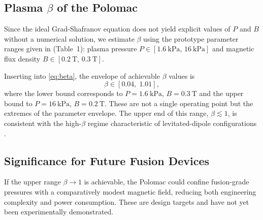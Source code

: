 \subsection{Plasma \texorpdfstring{$\beta$}{Beta} of the Polomac}

Since the ideal Grad-Shafranov equation does not yield explicit values of $P$
and $B$ without a numerical solution, we estimate $\beta$ using the prototype
parameter ranges given in \cite{Elio2024} (Table~1): plasma pressure
$P \in [\SI{1.6}{\kilo\pascal},\, \SI{16}{\kilo\pascal}]$ and magnetic flux
density $B \in [\SI{0.2}{\tesla},\, \SI{0.3}{\tesla}]$.

Inserting into \eqref{eq:beta}, the envelope of achievable $\beta$ values is
\begin{equation*}
    \beta \in [0.04,\; 1.01],
\end{equation*}
where the lower bound corresponds to $P = \SI{1.6}{\kilo\pascal}$,
$B = \SI{0.3}{\tesla}$ and the upper bound to $P = \SI{16}{\kilo\pascal}$,
$B = \SI{0.2}{\tesla}$. These are not a single operating point but the
extremes of the parameter envelope. The upper end of this range, $\beta \lesssim
1$, is consistent with the high-$\beta$ regime characteristic of levitated-dipole
configurations \cite{Nishiura2015, Garnier2006}.

\subsection*{Significance for Future Fusion Devices}
If the upper range $\beta\to1$ is achievable, the Polomac could confine fusion-grade
pressures with a comparatively modest magnetic field, reducing both
engineering complexity and power consumption.  These are design targets
and have not yet been experimentally demonstrated.